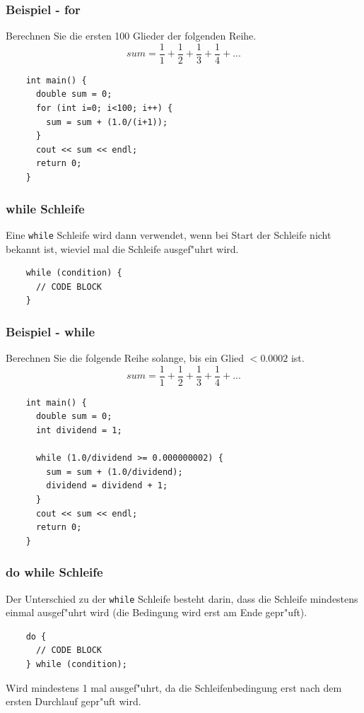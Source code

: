 \documentclass{beamer}
\begin{document}
\begin{frame}[fragile]
	\frametitle{Beispiel - for}
	Berechnen Sie die ersten 100 Glieder der folgenden Reihe.
	\begin{displaymath}
	sum = \frac{1}{1} + \frac{1}{2} + \frac{1}{3} + \frac{1}{4} + ...
	\end{displaymath}
	\begin{lstlisting}
	int main() {
	  double sum = 0;
	  for (int i=0; i<100; i++) {
	    sum = sum + (1.0/(i+1));
	  }
	  cout << sum << endl;
	  return 0;
	}
	\end{lstlisting}
\end{frame}

\begin{frame}[fragile]
	\frametitle{while Schleife}
	Eine \verb|while| Schleife wird dann verwendet, wenn bei Start der Schleife
	nicht bekannt ist, wieviel mal die Schleife ausgef"uhrt wird.
	\begin{lstlisting}
	while (condition) {
	  // CODE BLOCK
	}
	\end{lstlisting}
\end{frame}

\begin{frame}[fragile]
	\frametitle{Beispiel - while}
	Berechnen Sie die folgende Reihe solange, bis ein Glied $<0.0002$ ist.
	\begin{displaymath}
	sum = \frac{1}{1} + \frac{1}{2} + \frac{1}{3} + \frac{1}{4} + ...
	\end{displaymath}
	{\tiny
	\begin{lstlisting}
	int main() {
	  double sum = 0;
	  int dividend = 1;

	  while (1.0/dividend >= 0.000000002) {
	    sum = sum + (1.0/dividend);
	    dividend = dividend + 1;
	  }
	  cout << sum << endl;
	  return 0;
	}
	\end{lstlisting}
	}
\end{frame}

\begin{frame}[fragile]
	\frametitle{do while Schleife}
	Der Unterschied zu der \verb|while| Schleife besteht darin, dass die Schleife
	mindestens einmal ausgef"uhrt wird (die Bedingung wird erst am Ende gepr"uft).
	\begin{lstlisting}
	do {
	  // CODE BLOCK
	} while (condition);
	\end{lstlisting}
	Wird mindestens 1 mal ausgef"uhrt, da die Schleifenbedingung erst nach
	dem ersten Durchlauf gepr"uft wird.
\end{frame}
\end{document}
